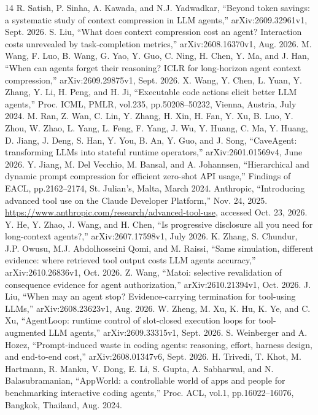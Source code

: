 \begin{thebibliography}{14}\small
{} R. Satish, P. Sinha, A. Kawada, and N.J. Yadwadkar, ``Beyond token savings: a systematic study of context compression in LLM agents,'' arXiv:2609.32961v1, Sept. 2026.
 S. Liu, ``What does context compression cost an agent? Interaction costs unrevealed by task-completion metrics,'' arXiv:2608.16370v1, Aug. 2026.
 M. Wang, F. Luo, B. Wang, G. Yao, Y. Guo, C. Ning, H. Chen, Y. Ma, and J. Han, ``When can agents forget their reasoning? ICLR for long-horizon agent context compression,'' arXiv:2609.29875v1, Sept. 2026.
 X. Wang, Y. Chen, L. Yuan, Y. Zhang, Y. Li, H. Peng, and H. Ji, ``Executable code actions elicit better LLM agents,'' Proc. ICML, PMLR, vol.235, pp.50208--50232, Vienna, Austria, July 2024.
 M. Ran, Z. Wan, C. Lin, Y. Zhang, H. Xin, H. Fan, Y. Xu, B. Luo, Y. Zhou, W. Zhao, L. Yang, L. Feng, F. Yang, J. Wu, Y. Huang, C. Ma, Y. Huang, D. Jiang, J. Deng, S. Han, Y. You, B. An, Y. Guo, and J. Song, ``CaveAgent: transforming LLMs into stateful runtime operators,'' arXiv:2601.01569v4, June 2026.
 Y. Jiang, M. Del Vecchio, M. Bansal, and A. Johannsen, ``Hierarchical and dynamic prompt compression for efficient zero-shot API usage,'' Findings of EACL, pp.2162--2174, St. Julian's, Malta, March 2024.
 Anthropic, ``Introducing advanced tool use on the Claude Developer Platform,'' Nov. 24, 2025. \url{https://www.anthropic.com/research/advanced-tool-use}, accessed Oct. 23, 2026.
 Y. He, Y. Zhao, J. Wang, and H. Chen, ``Is progressive disclosure all you need for long-context agents?,'' arXiv:2607.17598v1, July 2026.
 K. Zhang, S. Chundur, J.P. Owusu, M.J. Abdolhosseini Qomi, and M. Raissi, ``Same simulation, different evidence: where retrieved tool output costs LLM agents accuracy,'' arXiv:2610.26836v1, Oct. 2026.
 Z. Wang, ``Matoi: selective revalidation of consequence evidence for agent authorization,'' arXiv:2610.21394v1, Oct. 2026.
 J. Liu, ``When may an agent stop? Evidence-carrying termination for tool-using LLMs,'' arXiv:2608.23623v1, Aug. 2026.
 W. Zheng, M. Xu, K. Hu, K. Ye, and C. Xu, ``AgentLoop: runtime control of slot-closed execution loops for tool-augmented LLM agents,'' arXiv:2609.33315v1, Sept. 2026.
 S. Weinberger and A. Hozez, ``Prompt-induced waste in coding agents: reasoning, effort, harness design, and end-to-end cost,'' arXiv:2608.01347v6, Sept. 2026.
 H. Trivedi, T. Khot, M. Hartmann, R. Manku, V. Dong, E. Li, S. Gupta, A. Sabharwal, and N. Balasubramanian, ``AppWorld: a controllable world of apps and people for benchmarking interactive coding agents,'' Proc. ACL, vol.1, pp.16022--16076, Bangkok, Thailand, Aug. 2024.
\end{thebibliography}

